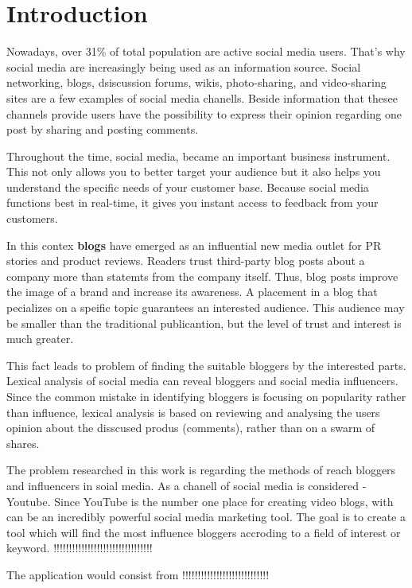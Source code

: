\section*{Introduction}


\setcounter{page}{12}

Nowadays, over 31\% of total population are active social media users.\cite{SMResearch} That's why social media are increasingly being used as an information source. Social networking, blogs, dsiscussion forums, wikis, photo-sharing, and video-sharing sites are a few examples of social media chanells. Beside information that thesee channels provide users have the possibility to express their opinion regarding one post by sharing and posting comments.

Throughout the time, social media, became an important business instrument. This not only allows you to better target your audience but it also helps you understand the specific needs of your customer base. Because social media functions best in real-time, it gives you instant access to feedback from your customers. 

In this contex \textbf{blogs} have emerged as an influential new media outlet for PR stories and product reviews. Readers trust third-party blog posts about a company more than statemts from the company itself. Thus, blog posts improve the image of a brand and increase its awareness. A placement in a blog that pecializes on a speific topic guarantees an interested audience. This audience may be smaller than the traditional publicantion, but the level of trust and interest is much greater. 

This fact leads to problem of finding the suitable bloggers by the interested parts. Lexical analysis of social media can reveal bloggers and social media influencers. Since the common mistake in identifying bloggers is focusing on popularity rather than influence, lexical analysis is based on reviewing and analysing the users opinion about the disscused produs (comments), rather than on 
a swarm of shares.

The problem researched in this work is regarding the methods of reach bloggers and influencers in soial media. As a chanell of social media is considered - Youtube. Since YouTube is the number one place for creating video blogs, with can be an incredibly powerful social media marketing tool. The goal is to create a tool which will find the most influence bloggers accroding to a field of interest or keyword. !!!!!!!!!!!!!!!!!!!!!!!!!!!!!!!!

The application would consist from  !!!!!!!!!!!!!!!!!!!!!!!!!!!!
\clearpage